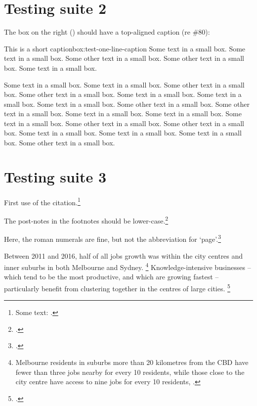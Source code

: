 \documentclass{grattan}
\begin{document}
\chapter{Testing suite 2}\label{chap:test-2}
The box on the right () should have a top-aligned caption (re \#80):

\begin{smallbox}{This is a short caption}{box:test-one-line-caption}
Some text in a small box. 
Some text in a small box. 
Some other text in a small box. 
Some other text in a small box. 
Some text in a small box. 

Some text in a small box. 
Some text in a small box. 
Some other text in a small box. 
Some other text in a small box. 
Some text in a small box. 
Some text in a small box. 
Some text in a small box. 
Some other text in a small box. 
Some other text in a small box. 
Some text in a small box. 
Some text in a small box. 
Some text in a small box. 
Some other text in a small box. 
Some other text in a small box. 
Some text in a small box. 
Some text in a small box. 
Some text in a small box. 
Some other text in a small box.  
\end{smallbox}

\chapter{Testing suite 3}\label{chap:ibid-postnote}
First use of the citation.\footnote{Some text: \textcite{PC-2014-Childcareearlychildhood}.}

The post-notes in the footnotes should be lower-case.\footcite[][14--15]{PC-2014-Childcareearlychildhood}

Here, the roman numerals are fine, but not the abbreviation for `page'.\footcite[][XXV]{PC-2014-Childcareearlychildhood}

Between 2011 and 2016, half of all jobs growth was  within the city centres and inner suburbs in both Melbourne and Sydney.%
	\footnote{Melbourne residents in suburbs more than 20 kilometres from the CBD have fewer than three jobs nearby for every 10 residents, while those close to the city centre have access to nine jobs for every 10 residents, .}
Knowledge-intensive businesses -- which tend to be the most productive, and which are growing fastest -- particularly benefit from clustering together in the centres of large cities.%
	\footcite[][23--29]{KellyDonegan2015-City-limits}
\end{document}
